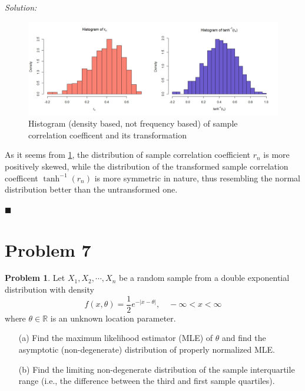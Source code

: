 \documentclass[12pt]{article}
\newcommand{\R}{\mathbb{R}}
\theoremstyle{definition}
\newtheorem*{prb}{Problem}
\newenvironment{problem}{\begin{tcolorbox}[colback=blue!5!white,colframe=blue!75!black, parbox = true] \begin{prb}  }{\end{prb}\end{tcolorbox} }
\newenvironment{answer}{\textit{Solution: }\quad }{ \hfill $\blacksquare$}
\numberwithin{equation}{section}
\begin{document}
\begin{answer}
\begin{enumerate}
    \begin{figure}[h]
        \centering
        \includegraphics[width = \linewidth]{plot.jpeg}
        \caption{Histogram (density based, not frequency based) of sample correlation coefficent and its transformation}
        \label{fig:6-1}
    \end{figure}

    As it seems from \cref{fig:6-1}, the distribution of sample correlation coefficient $r_n$ is more positively skewed,  while the distribution of the transformed sample correlation coefficent $\tanh^{-1}(r_n)$ is more symmetric in nature, thus resembling the normal distribution better than the untransformed one.
    \end{enumerate}

\end{answer}


\pagebreak
\section{Problem 7}

\begin{problem}
Let $X_1,X_2,\cdots,X_n$ be a random sample from a double exponential distribution with density
$$f(x,\theta)=\dfrac{1}{2}e^{-|x-\theta|},\quad -\infty<x<\infty $$
where $\theta \in \R$ is an unknown location parameter.
\begin{itemize}
    \item[(a)] Find the maximum likelihood estimator (MLE) of $\theta$ and find the asymptotic (non-degenerate) distribution of properly normalized MLE.
    \item[(b)] Find the limiting non-degenerate distribution of the sample
    interquartile range (i.e., the difference between the third and first sample quartiles). 
\end{itemize}
\end{problem}
\end{document}
